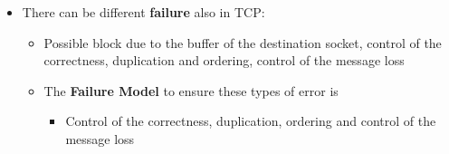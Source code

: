 \begin{itemize}
\begin{itemize}
\begin{itemize}
                \end{itemize}
        \end{itemize}
        \newpage
        \item There can be different \textbf{failure} also in TCP:
            \begin{itemize}
                \item Possible block due to the buffer of the destination socket, control of the correctness, duplication and ordering, control of the message loss
                \item The \textbf{Failure Model} to ensure these types of error is
                    \begin{itemize}
                        \item Control of the correctness, duplication, ordering and control of the message loss
                    \end{itemize}
            \end{itemize}
\end{itemize}